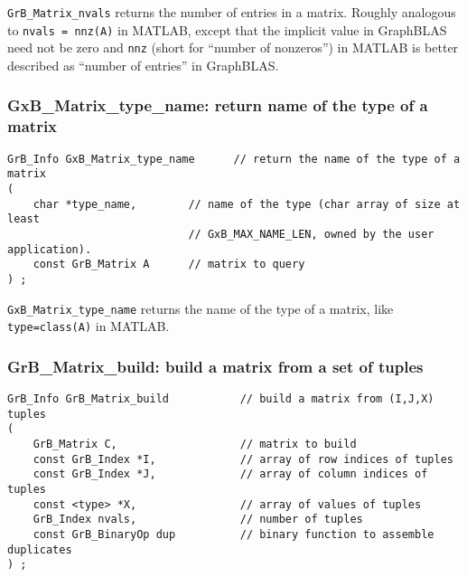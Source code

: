 \documentclass[12pt]{article}
\begin{document}
{\verb'GrB_Matrix_nvals' returns the number of entries in a matrix.  Roughly
analogous to \verb'nvals = nnz(A)' in MATLAB, except that the implicit value in
GraphBLAS need not be zero and \verb'nnz' (short for ``number of nonzeros'') in
MATLAB is better described as ``number of entries'' in GraphBLAS.

\newpage
\subsubsection{{\sf GxB\_Matrix\_type\_name:} return name of the type of a matrix}
\label{matrix_type_name}

\begin{mdframed}[userdefinedwidth=6in]
{\footnotesize
\begin{verbatim}
GrB_Info GxB_Matrix_type_name      // return the name of the type of a matrix
(
    char *type_name,        // name of the type (char array of size at least
                            // GxB_MAX_NAME_LEN, owned by the user application).
    const GrB_Matrix A      // matrix to query
) ;
\end{verbatim} } \end{mdframed}

\verb'GxB_Matrix_type_name' returns the name of the type of a matrix, like
\verb'type=class(A)' in MATLAB.

\subsubsection{{\sf GrB\_Matrix\_build:} build a matrix from a set of tuples}
\label{matrix_build}

\begin{mdframed}[userdefinedwidth=6in]
{\footnotesize
\begin{verbatim}
GrB_Info GrB_Matrix_build           // build a matrix from (I,J,X) tuples
(
    GrB_Matrix C,                   // matrix to build
    const GrB_Index *I,             // array of row indices of tuples
    const GrB_Index *J,             // array of column indices of tuples
    const <type> *X,                // array of values of tuples
    GrB_Index nvals,                // number of tuples
    const GrB_BinaryOp dup          // binary function to assemble duplicates
) ;
\end{verbatim} } \end{mdframed}

}
\end{document}

